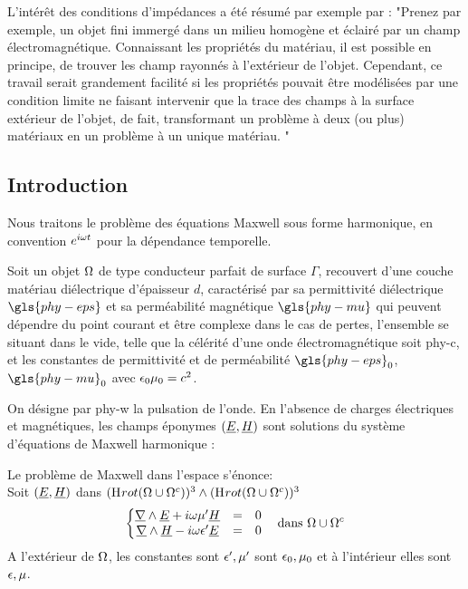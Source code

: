 
L'intérêt des conditions d'impédances a été résumé par exemple par \cite{senior_approximate_1995}:
"Prenez par exemple, un objet fini immergé dans un milieu homogène et éclairé par un champ électromagnétique.
Connaissant les propriétés du matériau, il est possible en principe, de trouver les champ rayonnés à l'extérieur de l'objet.
Cependant, ce travail serait grandement facilité si les propriétés pouvait être modélisées par une condition limite ne faisant intervenir que la trace des champs à la surface extérieur de l'objet, de fait, transformant un problème à deux (ou plus) matériaux en un problème à un unique matériau.
"

\subsection*{Introduction}
Nous traitons le problème des équations Maxwell sous forme harmonique, en convention $e^{i\omega t}$ pour la dépendance temporelle.


Soit un objet $\Omega$ de type conducteur parfait de surface $\Gamma$, recouvert d'une couche matériau diélectrique d'épaisseur $d$, caractérisé par sa permittivité diélectrique $\gls{phy-eps}$ et sa perméabilité magnétique $\gls{phy-mu}$ qui peuvent dépendre du point courant et être complexe dans le cas de pertes, l'ensemble se situant dans le vide, telle que la célérité d'une onde électromagnétique soit \gls{phy-c}, et les constantes de permittivité et de perméabilité $\gls{phy-eps}_0$, $\gls{phy-mu}_0$ avec $\epsilon_0\mu_0 = c^{2}$.


On désigne par \gls{phy-w} la pulsation de l'onde.
En l'absence de charges électriques et magnétiques, les champs éponymes $( \underline{E}, \underline{H} )$ sont solutions du système d'équations de Maxwell harmonique : 

Le problème de Maxwell dans l'espace s'énonce: \\

Soit $(\underline{E},\underline{H})$ dans $(\mathrm{H}_\mathrm{{}}{rot}(\Omega\cup\Omega^c))^3 \wedge (\mathrm{H}_\mathrm{{}}{rot}(\Omega\cup\Omega^c))^3$
\begin{equation}
\label{eq_pres_th_intro_maxwell}
\left\lbrace \begin{matrix}
\underline{\nabla} \wedge \underline{E} + i\omega\mu' \underline{H} &=& 0 \\
\underline{\nabla} \wedge \underline{H} - i\omega\epsilon' \underline{E} &=& 0 \\
\end{matrix} \right.
\quad \text{dans $\Omega\cup\Omega^c$}
\end{equation}
A l'extérieur de $\Omega$, les constantes sont $\epsilon',\mu'$ sont $\epsilon_0,\mu_0$ et à l'intérieur elles sont $\epsilon,\mu$.


